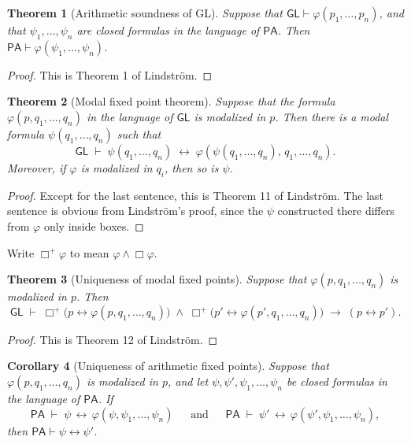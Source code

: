 \documentclass[12pt, letterpaper]{article}
\newtheorem{theorem}{Theorem}[section]
\newtheorem{corollary}[theorem]{Corollary}
\numberwithin{equation}{section}
\begin{document}
\begin{theorem}[Arithmetic soundness of \textsf{GL}] \label{theorem-arithmetic-soundness}
Suppose that $\mathsf{GL}\vdash\varphi(p_1,\dotsc,p_n)$, and that $\psi_1,\dotsc,\psi_n$ are closed formulas in the language of $\mathsf{PA}$. Then $\mathsf{PA}\vdash\varphi(\psi_1,\dotsc,\psi_n)$.
\end{theorem}

\begin{proof}
This is Theorem 1 of Lindstr\"om.
\end{proof}

\begin{theorem}[Modal fixed point theorem] \label{theorem-fpt}
Suppose that the formula $\varphi(p,q_1,\dotsc,q_n)$ in the language of $\mathsf{GL}$ is modalized in $p$. Then there is a modal formula $\psi(q_1,\dotsc,q_n)$ such that
\[
\mathsf{GL} \;\vdash\; \psi(q_1,\dotsc,q_n) \;\leftrightarrow\; \varphi(\psi(q_1,\dotsc,q_n),\,q_1,\dotsc,q_n).
\]
Moreover, if $\varphi$ is modalized in $q_i$, then so is $\psi$.
\end{theorem}

\begin{proof}
Except for the last sentence, this is Theorem 11 of Lindstr\"om. The last sentence is obvious from Lindstr\"om's proof, since the $\psi$ constructed there differs from $\varphi$ only inside boxes.
\end{proof}

Write $\Box^+\varphi$ to mean $\varphi\wedge\Box\varphi$.

\begin{theorem}[Uniqueness of modal fixed points] \label{theorem-ufpt}
Suppose that $\varphi(p,q_1,\dotsc,q_n)$ is modalized in $p$. Then
\[
\mathsf{GL} \;\vdash\; \Box^+\big(p\leftrightarrow\varphi(p,q_1,\dotsc,q_n)\big) \;\wedge\; \Box^+\big(p'\leftrightarrow\varphi(p',q_1,\dotsc,q_n)\big) \;\to\; (p\leftrightarrow p').
\]
\end{theorem}

\begin{proof}
This is Theorem 12 of Lindstr\"om.
\end{proof}

\begin{corollary}[Uniqueness of arithmetic fixed points] \label{corollary-arithmetic-ufpt}
Suppose that $\varphi(p,q_1,\dotsc,q_n)$ is modalized in $p$, and let $\psi,\psi',\psi_1,\dotsc,\psi_n$ be closed formulas in the language of $\mathsf{PA}$. If
\[
\mathsf{PA}\;\vdash\;\psi\,\leftrightarrow\,\varphi(\psi,\psi_1,\dotsc,\psi_n) \;\quad\;\text{and}\;\quad\; \mathsf{PA}\;\vdash\;\psi'\,\leftrightarrow\,\varphi(\psi',\psi_1,\dotsc,\psi_n),
\]
then $\mathsf{PA}\vdash\psi\leftrightarrow\psi'$.
\end{corollary}
\end{document}
